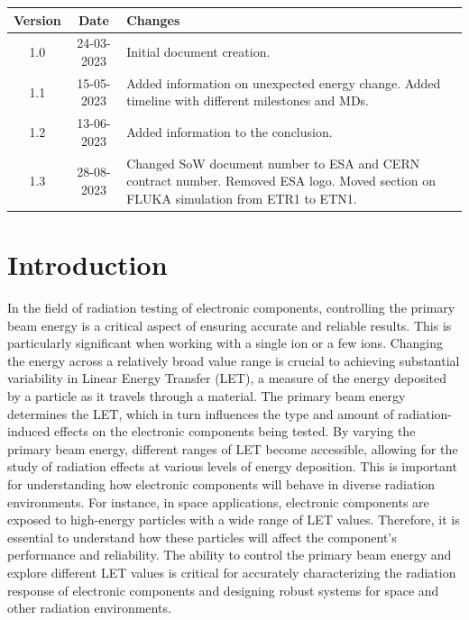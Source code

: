 \documentclass{cernatsnote}
\begin{document}
\noindent
\begin{tabularx}{\textwidth}{|c|c|X|}
\hline
\textbf{Version} & \textbf{Date} & \textbf{Changes} \\
\hline
1.0 & 24-03-2023 & Initial document creation. \\
\hline
1.1 & 15-05-2023 &  Added information on unexpected energy change. Added timeline with different milestones and MDs.\\
\hline
1.2 & 13-06-2023 & Added information to the conclusion. \\
\hline
1.3 & 28-08-2023 & Changed SoW document number to ESA and CERN contract number. Removed ESA logo. Moved section on FLUKA simulation from ETR1 to ETN1.\\
\hline
\end{tabularx}

\newpage

\section{Introduction}
In the field of radiation testing of electronic components, controlling the primary beam energy is a critical aspect of ensuring accurate and reliable results. This is particularly significant when working with a single ion or a few ions. Changing the energy across a relatively broad value range is crucial to achieving substantial variability in Linear Energy Transfer (LET), a measure of the energy deposited by a particle as it travels through a material. The primary beam energy determines the LET, which in turn influences the type and amount of radiation-induced effects on the electronic components being tested. By varying the primary beam energy, different ranges of LET become accessible, allowing for the study of radiation effects at various levels of energy deposition. This is important for understanding how electronic components will behave in diverse radiation environments. For instance, in space applications, electronic components are exposed to high-energy particles with a wide range of LET values. Therefore, it is essential to understand how these particles will affect the component's performance and reliability. The ability to control the primary beam energy and explore different LET values is critical for accurately characterizing the radiation response of electronic components and designing robust systems for space and other radiation environments.
\end{document}
